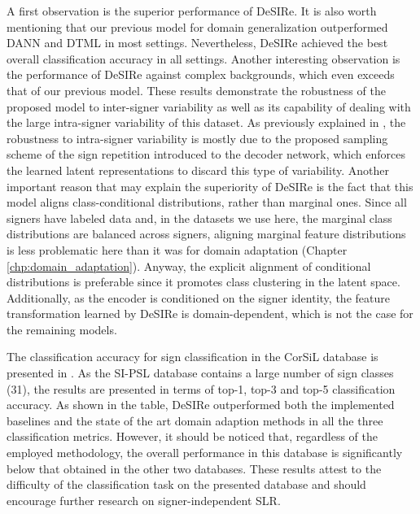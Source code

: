 A first observation is the superior performance of DeSIRe. It is also worth mentioning that our previous model for domain generalization outperformed DANN and DTML in most settings. Nevertheless, DeSIRe achieved the best overall classification accuracy in all settings. Another interesting observation is the performance of DeSIRe against complex backgrounds, which even exceeds that of our previous model. These results demonstrate the robustness of the proposed model to inter-signer variability as well as its capability of dealing with the large intra-signer variability of this dataset. As previously explained in , the robustness to intra-signer variability is mostly due to the proposed sampling scheme of the sign repetition introduced to the decoder network, which enforces the learned latent representations to discard this type of variability. Another important reason that may explain the superiority of DeSIRe is the fact that this model aligns class-conditional distributions, rather than marginal ones. Since all signers have labeled data and, in the datasets we use here, the marginal class distributions are balanced across signers, aligning marginal feature distributions is less problematic here than it was for domain adaptation (Chapter \ref{chp:domain_adaptation}). Anyway, the explicit alignment of conditional distributions is preferable since it promotes class clustering in the latent space. Additionally, as the encoder is conditioned on the signer identity, the feature transformation learned by DeSIRe is domain-dependent, which is not the case for the remaining models.

The classification accuracy for sign classification in the CorSiL database is presented in . As the SI-PSL database contains a large number of sign classes (31), the results are presented in terms of top-1, top-3 and top-5 classification accuracy. As shown in the table, DeSIRe outperformed both the implemented baselines and the state of the art domain adaption methods in all the three classification metrics. However, it should be noticed that, regardless of the employed methodology, the overall performance in this database is significantly below that obtained in the other two databases. These results attest to the difficulty of the classification task on the presented database and should encourage further research on signer-independent SLR.

